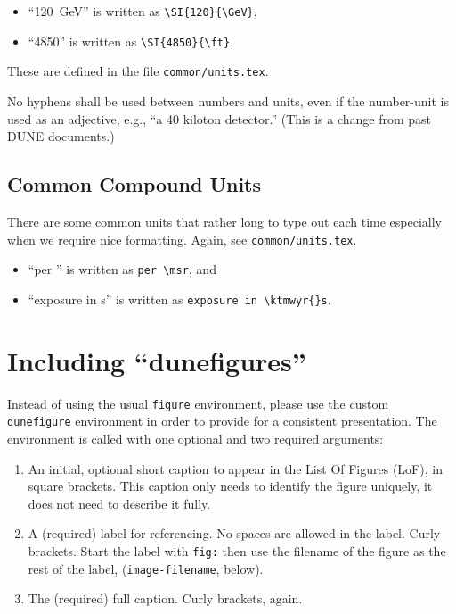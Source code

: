 \begin{itemize}
\item ``\SI{120}{\GeV}'' is written as \verb|\SI{120}{\GeV}|,
\item ``\SI{4850}{\ft}'' is written as \verb|\SI{4850}{\ft}|,
\end{itemize}

These are defined in the file \texttt{common/units.tex}.

No hyphens shall be used between numbers and units, even if the number-unit is used as an adjective, e.g., ``a 40 kiloton detector.''  (This is a change from past DUNE documents.) 

\subsection{Common Compound Units}

There are some common units that rather long to type out each time
especially when we require nice formatting. Again, see \texttt{common/units.tex}.

\begin{itemize}
\item ``per \msr'' is written as \verb|per \msr|, and
\item ``exposure in \ktmwyr{}s'' is written as \verb|exposure in \ktmwyr{}s|.
\end{itemize}


\section{Including ``dunefigures''}
\label{sec:latex-figures}

Instead of using the usual \texttt{figure} environment, please use the custom \texttt{dunefigure}
environment in order to provide for a consistent presentation.
The environment is called with one optional and two required
arguments:

\begin{enumerate}
\item An initial, optional short caption to appear in the List Of Figures (LoF), in square brackets. This caption only needs to
identify the figure uniquely, it does not need to describe it fully.
\item A (required) label for referencing. No spaces are allowed in the label. Curly brackets. Start the label with \texttt{fig:} then use the filename of the figure as the rest of the label, (\texttt{image-filename}, below). 
\item The (required) full caption. Curly brackets, again.
\end{enumerate}

